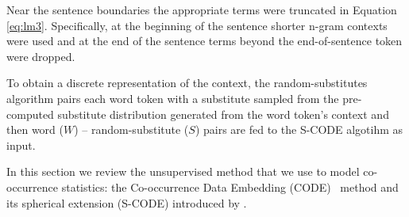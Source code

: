 Near the sentence boundaries the appropriate terms were truncated in
Equation \ref{eq:lm3}.  Specifically, at the beginning of the sentence
shorter n-gram contexts were used and at the end of the sentence terms
beyond the end-of-sentence token were dropped.

To obtain a discrete representation of the context, the
random-substitutes algorithm pairs each word token with a substitute
sampled from the pre-computed substitute distribution generated from
the word token's context and then word ($W$) -- random-substitute
($S$) pairs are fed to the S-CODE algotihm as input.

\label{app:codethr}

In this section we review the unsupervised method that we use to model
co-occurrence statistics: the Co-occurrence Data Embedding
(CODE)\ \cite{globerson2007euclidean} method and its spherical
extension (S-CODE) introduced by \cite{maron2010sphere}.

